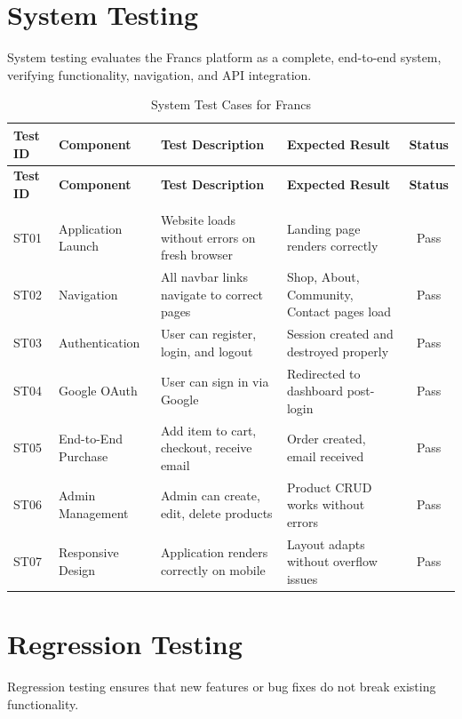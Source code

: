 \newpage
\section{System Testing}
System testing evaluates the Francs platform as a complete, end-to-end system, verifying functionality, navigation, and API integration.

\renewcommand{\arraystretch}{1.3}
\begin{longtable}{|p{1.5cm}|p{2.5cm}|p{4cm}|p{3.5cm}|c|}
    \hline
    \textbf{Test ID} & \textbf{Component} & \textbf{Test Description} & \textbf{Expected Result} & \textbf{Status} \\
    \hline
    \endfirsthead
    \hline
    \textbf{Test ID} & \textbf{Component} & \textbf{Test Description} & \textbf{Expected Result} & \textbf{Status} \\
    \hline
    \endhead
    \hline
    \endfoot
    \hline
    \caption{System Test Cases for Francs} \label{tab:system_tests} \\
    \endlastfoot
    ST01 & Application Launch & \raggedright Website loads without errors on fresh browser & \raggedright Landing page renders correctly & Pass \\
    \hline
    ST02 & Navigation & \raggedright All navbar links navigate to correct pages & \raggedright Shop, About, Community, Contact pages load & Pass \\
    \hline
    ST03 & Authentication & \raggedright User can register, login, and logout & \raggedright Session created and destroyed properly & Pass \\
    \hline
    ST04 & Google OAuth & \raggedright User can sign in via Google & \raggedright Redirected to dashboard post-login & Pass \\
    \hline
    ST05 & End-to-End Purchase & \raggedright Add item to cart, checkout, receive email & \raggedright Order created, email received & Pass \\
    \hline
    ST06 & Admin Management & \raggedright Admin can create, edit, delete products & \raggedright Product CRUD works without errors & Pass \\
    \hline
    ST07 & Responsive Design & \raggedright Application renders correctly on mobile & \raggedright Layout adapts without overflow issues & Pass \\
    \hline
\end{longtable}

\newpage
\section{Regression Testing}
Regression testing ensures that new features or bug fixes do not break existing functionality.

